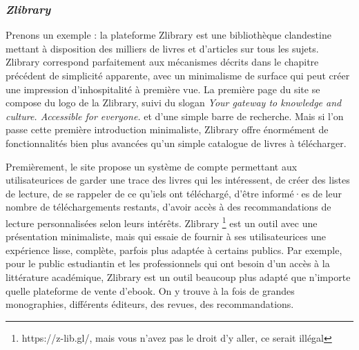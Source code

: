 \subsubsection*{\textit{Zlibrary}}
Prenons un exemple : la plateforme Zlibrary est une bibliothèque clandestine mettant à disposition des milliers de livres et d'articles sur tous les sujets. Zlibrary correspond parfaitement aux mécanismes décrits dans le chapitre précédent de simplicité apparente, avec un minimalisme de surface qui peut créer une impression d’inhospitalité à première vue. La première page du site se compose du logo de la Zlibrary, suivi du slogan \og \textit{ Your gateway to knowledge and culture. Accessible for everyone. } \fg et d'une simple barre de recherche. Mais si l'on passe cette première introduction minimaliste, Zlibrary offre énormément de fonctionnalités bien plus avancées qu'un simple catalogue de livres à télécharger. 

Premièrement, le site propose un système de compte permettant aux utilisateurices de garder une trace des livres qui les intéressent, de créer des listes de lecture, de se rappeler de ce qu'iels ont téléchargé, d'être informé·es de leur nombre de téléchargements restants, d'avoir accès à des recommandations de lecture personnalisées selon leurs intérêts. Zlibrary \footnote{https://z-lib.gl/, mais vous n'avez pas le droit d'y aller, ce serait illégal} est un outil avec une présentation minimaliste, mais qui essaie de fournir à ses utilisateurices une expérience lisse, complète, parfois plus adaptée à certains publics. Par exemple, pour le public estudiantin et les professionnels qui ont besoin d'un accès à la littérature académique, Zlibrary est un outil beaucoup plus adapté que n'importe quelle plateforme de vente d'ebook. On y trouve à la fois de grandes monographies, différents éditeurs, des revues, des recommandations.

